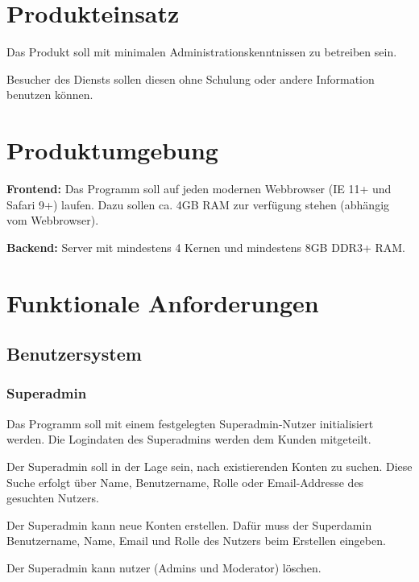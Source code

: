 \documentclass[parskip=full,11pt,twoside]{scrartcl}
\begin{document}
\section{Produkteinsatz}

Das Produkt soll mit minimalen Administrationskenntnissen zu betreiben sein.

Besucher des Diensts sollen diesen ohne Schulung oder andere Information benutzen können.

\section{Produktumgebung}

\textbf{Frontend:} Das Programm soll auf jeden modernen Webbrowser (IE 11+ und Safari 9+) laufen. Dazu sollen ca. 4GB RAM zur verfügung stehen (abhängig vom Webbrowser).

\textbf{Backend:} Server mit mindestens 4 Kernen und mindestens 8GB DDR3+ RAM.

\section{Funktionale Anforderungen}

\subsection{Benutzersystem}

\subsubsection{Superadmin}

Das Programm soll mit einem festgelegten Superadmin-Nutzer initialisiert werden. Die Logindaten des Superadmins werden dem Kunden mitgeteilt.

Der Superadmin soll in der Lage sein, nach existierenden Konten zu suchen. Diese Suche erfolgt über Name, Benutzername, Rolle oder Email-Addresse des gesuchten Nutzers. 

Der Superadmin kann neue Konten erstellen. Dafür muss der Superdamin Benutzername, Name, Email und Rolle des Nutzers beim Erstellen eingeben.


Der Superadmin kann nutzer (Admins und Moderator) löschen. 
\end{document}
